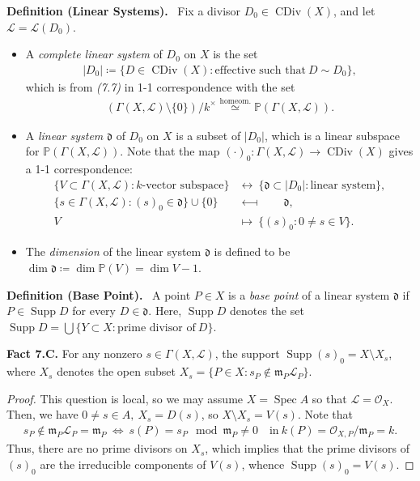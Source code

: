 \documentclass[11pt,a4paper,footinclude=true,headinclude=true]{scrbook} %
\DeclareMathOperator{\Supp}{Supp}
\DeclareMathOperator{\Spec}{Spec}
\DeclareMathOperator{\CDiv}{CDiv}
\newcommand{\LL}{\mathscr{L}}
\newcommand{\OO}{\mathcal{O}}
\newcommand{\PP}{\mathbb{P}}
\newcommand{\dd}{\mathfrak{d}}
\newcommand{\mm}{\mathfrak{m}}
\newcommand{\<}{\langle}
\newcommand{\>}{\rangle}
\newenvironment{definition}[2][Definition]
    { \begin{mdframed}[backgroundcolor=gray!20] \textbf{#1 #2.}\ }
    {  \end{mdframed}}
\newenvironment{fact}[2][Fact]
    { \begin{mdframed}[backgroundcolor=gray!20] \textbf{#1 #2.} }
    {  \end{mdframed}}
\begin{document}
\begin{definition}{(Linear Systems)}
    Fix a divisor $D_0\in\CDiv(X)$, and let $\LL=\LL(D_0)$.
    \begin{itemize}
        \item A \textit{complete linear system} of $D_0$ on $X$ is the set
        \begin{align*}
            |D_0|\coloneqq\{D\in\CDiv(X):\text{effective such that}\ D\sim D_0\},
        \end{align*}
        which is from \textit{(7.7)} in 1-1 correspondence with the set
        \begin{align*}
            (\Gamma(X,\LL)\setminus\{0\})/k^\times\overset{\text{homeom.}}{\simeq}\PP(\Gamma(X,\LL)).
        \end{align*}
        \item A \textit{linear system} $\dd$ of $D_0$ on $X$ is a subset of $|D_0|$, which is a linear subspace for $\PP(\Gamma(X,\LL))$.
        Note that the map $(\cdot)_0:\Gamma(X,\LL)\to\CDiv(X)$ gives a 1-1 correspondence:
        \begin{align*}
            \{V\subset\Gamma(X,\LL):k\text{-vector subspace}\} &\longleftrightarrow\ \{\dd\subset|D_0|:\text{linear system}\},\\ \{s\in\Gamma(X,\LL):(s)_0\in\dd\}\cup\{0\} &\longmapsfrom\qquad \dd,\\ V\qquad &\longmapsto\ \{(s)_0:0\neq s\in V\}.
        \end{align*}
        \item The \textit{dimension} of the linear system $\dd$ is defined to be $\dim\dd\coloneqq\dim\PP(V)=\dim V-1$.
    \end{itemize}
\end{definition}

\begin{definition}{(Base Point)}
    \newline A point $P\in X$ is a \textit{base point} of a linear system $\dd$ if $P\in\Supp D$ for every $D\in\dd$. Here, $\Supp D$ denotes the set $\Supp D=\bigcup\{Y\subset X:\text{prime divisor of}\ D\}$.
\end{definition}

\begin{fact}{7.C}
    For any nonzero $s\in\Gamma(X,\LL)$, the support $\Supp(s)_0=X\setminus X_s$, where $X_s$ denotes the open subset $X_s=\{P\in X:s_P\notin\mm_P\LL_P\}$.
\end{fact}
\begin{proof}
    This question is local, so we may assume $X=\Spec A$ so that $\LL=\OO_X$. Then, we have $0\neq s\in A,\ X_s=D(s)$, so $X\setminus X_s=V(s)$. Note that
    \begin{align*}
        s_P\notin\mm_P\LL_P=\mm_P\ \Longleftrightarrow\ s(P)=s_P\mod\mm_P\neq0\quad\text{in}\ k(P)=\OO_{X,P}/\mm_P=k.
    \end{align*}
    Thus, there are no prime divisors on $X_s$, which implies that the prime divisors of $(s)_0$ are the irreducible components of $V(s)$, whence $\Supp(s)_0=V(s)$.
\end{proof}
\end{document}
